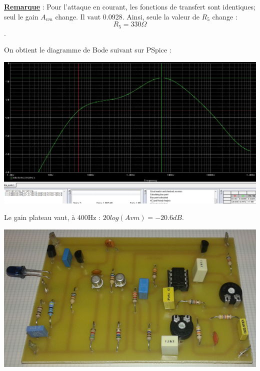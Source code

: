 \documentclass[a4paper]{report}
\begin{document}
\textbf{\underline{Remarque}} :
\newline
\newline
Pour l'attaque en courant, les fonctions de transfert sont identiques; seul le gain $A_{vm}$ change. Il vaut 0.0928. Ainsi, seule la valeur de $R_5$ change :
$$R_5 = 330\Omega$$.

On obtient le diagramme de Bode suivant sur PSpice :

\begin{center}
\includegraphics[width=1\textwidth]{bode_filtre.PNG}
\end{center}

Le gain plateau vaut, à 400Hz : $20log(Avm) = -20.6dB$.



\begin{center}
\includegraphics[width=1\textwidth]{pcb.PNG}
\end{center}
\end{document}

